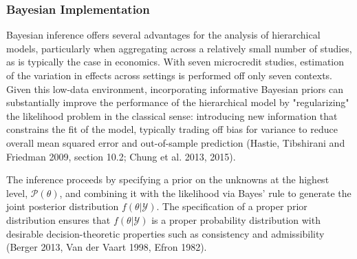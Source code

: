 \documentclass[english,12pt]{article}\usepackage{lmodern}
\numberwithin{equation}{section}
\begin{document}


\subsubsection{Bayesian Implementation}

Bayesian inference offers several advantages for the analysis of hierarchical models, particularly when aggregating across a relatively small number of studies, as is typically the case in economics. With seven microcredit studies, estimation of the variation in effects across settings is performed off only seven contexts. Given this low-data environment, incorporating informative Bayesian priors can substantially improve the performance of the hierarchical model by "regularizing" the likelihood problem in the classical sense: introducing new information that constrains the fit of the model, typically trading off bias for variance to reduce overall mean squared error and out-of-sample prediction (Hastie, Tibshirani and Friedman 2009, section 10.2; Chung et al. 2013, 2015). 

The inference proceeds by specifying a prior on the unknowns at the highest level, $\mathcal{P}(\theta)$, and combining it with the likelihood via Bayes' rule to generate the joint posterior distribution $f(\theta | \mathcal{Y}) $. The specification of a proper prior distribution ensures that $f(\theta | \mathcal{Y}) $ is a proper probability distribution with desirable decision-theoretic properties such as consistency and admissibility (Berger 2013, Van der Vaart 1998, Efron 1982). 
\end{document}
